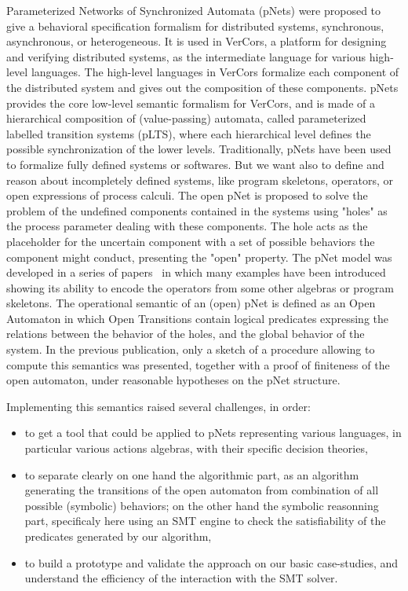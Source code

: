 \documentclass{lncs/llncs}
\begin{document}
Parameterized Networks of Synchronized Automata (pNets) were proposed
to give a behavioral specification formalism for distributed
systems, synchronous, asynchronous, or heterogeneous. It is used in
VerCors, a platform for designing and 
verifying distributed systems, as the intermediate language for various
high-level languages. The high-level languages in VerCors formalize
each component of the 
distributed system and gives out the composition of these
components.
pNets provides the core low-level semantic formalism for VerCors, and
is made of a hierarchical composition of (value-passing) automata,
called parameterized labelled transition systems (pLTS), where each
hierarchical level defines the possible synchronization of the lower levels.
Traditionally, pNets have been used to formalize fully
defined systems or softwares. But we want also to define and reason
about incompletely defined systems, like program skeletons, operators,
or open expressions of process calculi.
The open pNet is proposed to solve the
problem of the undefined components contained in the systems using
"holes" as the process parameter dealing with these components. The
hole acts as the placeholder for the uncertain component with a set of
possible behaviors the component might conduct, presenting the "open"
property.  
The pNet model was developed in a series of
papers~\cite{HMZ:PDP15,henrio:Forte2016} in which many examples have been
introduced showing its ability to encode the operators from some
other algebras or  program skeletons.
The operational semantic of an (open) pNet is defined as an
Open Automaton in which Open Transitions contain logical predicates
expressing the relations between the behavior of the holes, and the
global behavior of the system. In the previous publication,
only a sketch of a procedure allowing to compute this semantics was
presented, together with a proof of finiteness of the open automaton, under
reasonable hypotheses on the pNet structure.

Implementing this semantics raised several challenges, in order:
\begin{itemize}
  \item to get a tool that could be applied to pNets representing
    various languages, in particular various actions algebras,
    with their specific decision theories,
  \item to separate clearly on one hand the algorithmic part, as an
      algorithm generating the transitions of the open automaton from
      combination of all possible (symbolic) behaviors; on the other hand
      the symbolic reasonning part, specificaly here using an SMT
      engine to check the
      satisfiability of the predicates generated by our algorithm,
  \item to build a prototype and validate the approach on our basic
    case-studies, and understand the efficiency of the interaction
    with the SMT solver.
\end{itemize}
\end{document}
